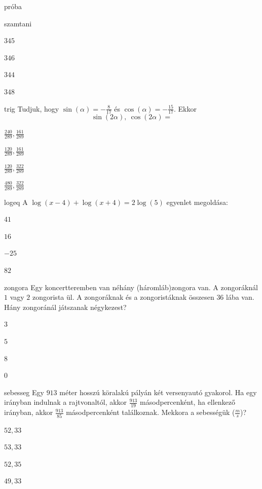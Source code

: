\documentclass[12pt]{article}
\begin{document}
\begin{quiz}{próba}
\begin{multi}{szamtani}
\item* $345$
\item  $346$
\item  $344$
\item  $348$
\end{multi}
\begin{multi}{trig}
Tudjuk, hogy $ \sin(\alpha) =-\frac{8}{17}$ és $ \cos(\alpha) = -\frac{15}{17} $. 
Ekkor $$ \sin(2\alpha),\ \cos(2\alpha)=$$
\item* $ \frac{240}{289}, \frac{161}{289} $
\item  $ \frac{120}{289}, \frac{161}{289} $
\item  $ \frac{120}{289}, \frac{322}{289} $
\item  $ \frac{480}{289}, \frac{322}{289} $
\end{multi}
\begin{multi}{logeq}
A $ \log(x-4)+\log(x+4)=2\log(5) $ egyenlet megoldása:
\item* $ 41  $
\item  $ 16 $
\item  $ -25 $
\item  $ 82 $
\end{multi}
\begin{multi}{zongora}
Egy koncertteremben van néhány (háromláb)zongora van. A zongoráknál 
$1$ vagy $2$ zongorista ül. A zongoráknak és a zongoristáknak összesen $36$ 
lába van. Hány zongoránál játszanak négykezest?
\item* $ 3  $
\item  $ 5 $
\item  $ 8 $
\item  $ 0 $
\end{multi}
\begin{multi}{sebesseg}
Egy $913$ méter hosszú köralakú pályán két versenyautó gyakorol. Ha egy irányban 
indulnak a rajtvonaltól, akkor $\frac{913}{19}$ másodpercenként, ha ellenkező irányban, akkor 
$\frac{913}{85}$ másodpercenként találkoznak. Mekkora a sebességük ($\frac{m}{s}$)?
\item* $ 52, 33  $
\item  $ 53, 33 $
\item  $ 52, 35 $
\item  $ 49, 33 $
\end{multi}
\end{quiz}
\end{document}
